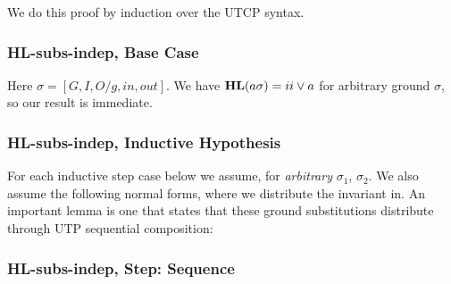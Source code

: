 We do this proof by induction over the UTCP syntax.

\subsubsection{\textsf{HL-subs-indep}, Base Case}

Here $\sigma=[G,I,O/g,in,out]$.
We have $\mathbf{HL}(a\sigma) = ii \lor a$ for arbitrary ground $\sigma$,
so our result is immediate.

\newpage
\subsubsection{\textsf{HL-subs-indep}, Inductive Hypothesis}

For each inductive step case below we assume,
for \emph{arbitrary} $\sigma_1$, $\sigma_2$.
We also assume the following normal forms,
where we distribute the invariant in.
An important lemma is one that states that these ground substitutions
distribute through UTP sequential composition:

\subsubsection{\textsf{HL-subs-indep}, Step: Sequence}

